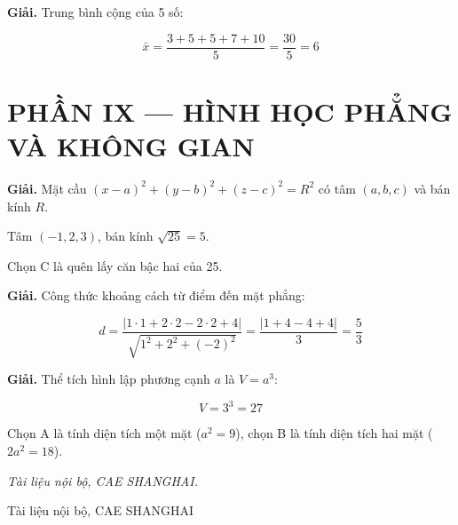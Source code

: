 \documentclass[11pt, a4paper]{article}
\begin{document}
\vspace{0.3cm}
\begin{dapan}[45 — Đáp án B]

\textbf{Giải.} Trung bình cộng của 5 số:

$$\bar{x} = \dfrac{3 + 5 + 5 + 7 + 10}{5} = \dfrac{30}{5} = 6$$

\section{PHẦN IX — HÌNH HỌC PHẲNG VÀ KHÔNG GIAN}


\end{dapan}
\vspace{0.3cm}
\begin{dapan}[46 — Đáp án A]

\textbf{Giải.} Mặt cầu $(x - a)^2 + (y - b)^2 + (z - c)^2 = R^2$ có tâm $(a, b, c)$ và bán kính $R$.

Tâm $(-1, 2, 3)$, bán kính $\sqrt{25} = 5$.

 Chọn C là quên lấy căn bậc hai của 25.


\end{dapan}
\vspace{0.3cm}
\begin{dapan}[47 — Đáp án C]

\textbf{Giải.} Công thức khoảng cách từ điểm đến mặt phẳng:

$$d = \dfrac{\lvert 1 \cdot 1 + 2 \cdot 2 - 2 \cdot 2 + 4 \rvert}{\sqrt{1^2 + 2^2 + (-2)^2}} = \dfrac{\lvert 1 + 4 - 4 + 4 \rvert}{3} = \dfrac{5}{3}$$


\end{dapan}
\vspace{0.3cm}
\begin{dapan}[48 — Đáp án D]

\textbf{Giải.} Thể tích hình lập phương cạnh $a$ là $V = a^3$:

$$V = 3^3 = 27$$

 Chọn A là tính diện tích một mặt ($a^2 = 9$), chọn B là tính diện tích hai mặt ($2a^2 = 18$).

\emph{Tài liệu nội bộ, CAE SHANGHAI.}
\end{dapan}
\vspace{0.3cm}

\vspace{0.8cm}
\begin{center}
{\footnotesize\color{cae_blue} Tài liệu nội bộ, CAE SHANGHAI}
\end{center}
\end{document}
